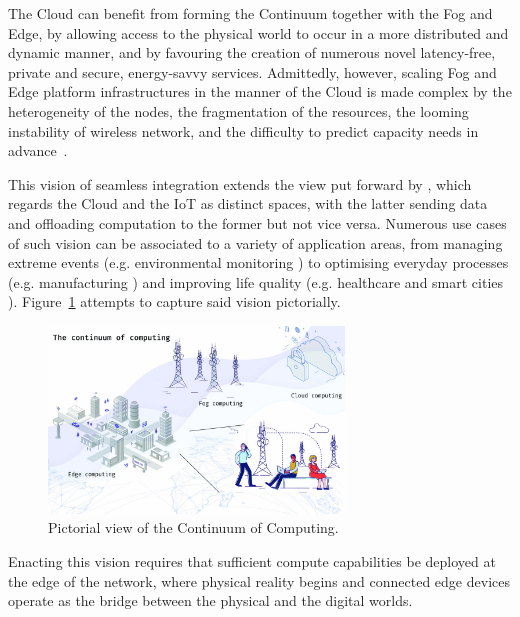 The Cloud can benefit from forming the Continuum together with the Fog and Edge, by allowing access to the physical world to occur in a more distributed and dynamic manner, and by favouring the creation of numerous novel latency-free, private and secure, energy-savvy services. 
Admittedly, however, scaling Fog and Edge platform infrastructures in the manner of the Cloud is made complex by the heterogeneity of the nodes, the fragmentation of the resources, the looming instability of wireless network, and the difficulty to predict capacity needs in advance~\cite{nygren2010akamai}. 

This vision of seamless integration extends the view put forward by \cite{botta2016integration}, which regards the Cloud and the IoT as distinct spaces, with the latter sending data and offloading computation to the former but not vice versa.
Numerous use cases of such vision can be associated to a variety of application areas, from managing extreme events (e.g. environmental monitoring \cite{brzoza2016embedded}) to optimising everyday processes (e.g. manufacturing \cite{chen2018edge}) and improving life quality (e.g. healthcare \cite{pace2018edge} and smart cities \cite{he2017multitier}).
Figure~\ref{fig:continuum} attempts to capture said vision pictorially. 
\begin{figure}[ht]
\centering
\includegraphics[width=0.7\textwidth]{figures/continuum}
\caption{Pictorial view of the Continuum of Computing.}
\label{fig:continuum}
\end{figure}
Enacting this vision requires that sufficient compute capabilities be deployed at the edge of the network, where physical reality begins and connected edge devices operate as the bridge between the physical and the digital worlds.

